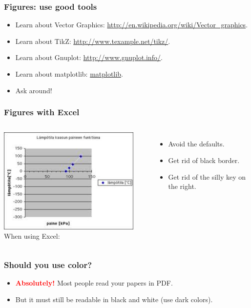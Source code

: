 \documentclass[handout]{beamer}
\newcommand{\vimportant}[1]{\textcolor{red}{\textbf{#1}}}
\begin{document}
\frame
{
  \frametitle{Figures: use good tools}

    \begin{itemize}
  \item<1->  Learn about Vector Graphics: \url{http://en.wikipedia.org/wiki/Vector_graphics}.
  \item<2->  Learn about TikZ: \url{http://www.texample.net/tikz/}.
  \item<3->  Learn about Gnuplot: \url{http://www.gnuplot.info/}.
  \item<4->  Learn about matplotlib: \url{matplotlib}.
  \item<5-> Ask around!
  \end{itemize}
 }


\frame
{
  \frametitle{Figures with Excel}
  \begin{columns}
 \column{8cm}
  \includegraphics[width=7cm]{excel.jpeg}
 \column{3cm}
 When using Excel:
  \begin{itemize}
  \item<1->  Avoid the defaults.
  \item<2->  Get rid of black border.
  \item<3->  Get rid of the silly key on the right.
  \end{itemize}
 \end{columns}
 \vspace{1cm}

 }

\frame
{
  \frametitle{Should you use color?}

   \begin{itemize}
  \item<1-> \vimportant{Absolutely!} Most people read your papers in PDF.
  \item<2-> But it must still be readable in black and white (use dark colors).
  \end{itemize}
}
\end{document}

